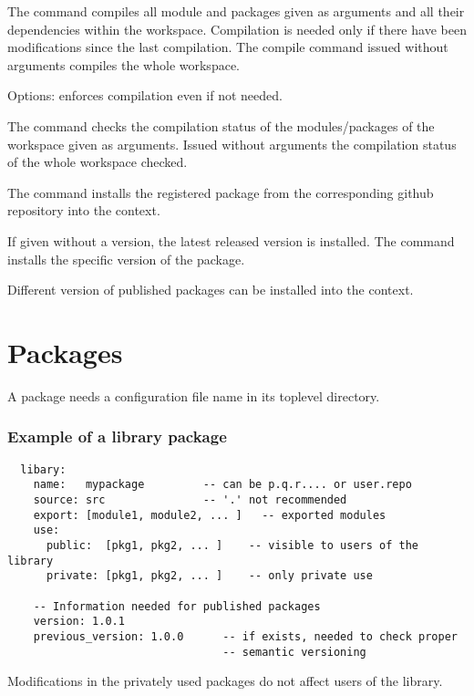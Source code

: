 \begin{description}
\begin{description}
  \end{description}

\item[\code{compile}] The command 
  compiles all module and packages given as arguments and all their
  dependencies within the workspace. Compilation is needed only if there have
  been modifications since the last compilation. The compile command issued
  without arguments compiles the whole workspace.

  Options:  enforces compilation even if not needed.

\item[\code{status}] The command  checks
  the compilation status of the modules/packages of the workspace given as
  arguments. Issued without arguments the compilation status of the whole
  workspace checked.


\item[\code{install}] The command  installs the
  registered package  from the corresponding github
  repository into the context.

  If given without a version, the latest released version is installed. The
  command  installs the specific version of
  the package.

  Different version of published packages can be installed into the context.


\item[\code{remove}]


\item[\code{publish}]

\end{description}



\section{Packages}

A package needs a configuration file name  in its
toplevel directory.

\subsubsection{ Example of a library package}
{\small
\begin{verbatim}
  libary:
    name:   mypackage         -- can be p.q.r.... or user.repo
    source: src               -- '.' not recommended
    export: [module1, module2, ... ]   -- exported modules
    use:
      public:  [pkg1, pkg2, ... ]    -- visible to users of the library
      private: [pkg1, pkg2, ... ]    -- only private use

    -- Information needed for published packages
    version: 1.0.1
    previous_version: 1.0.0      -- if exists, needed to check proper
                                 -- semantic versioning
\end{verbatim}
}
%
Modifications in the privately used packages do not affect users of the
library.



